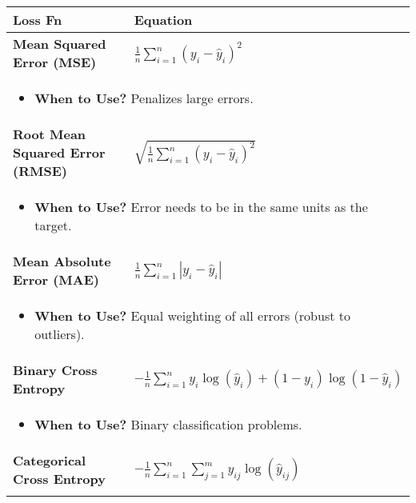 \documentclass{article}
\begin{document}
\begin{summary}
    \begin{center}
        \begin{tabular}{ll}
            \toprule
            \textbf{Loss Fn} & \textbf{Equation} \\ 
            \toprule
            \textbf{Mean Squared Error (MSE)} & $\frac{1}{n} \sum_{i=1}^{n} (y_i - \hat{y}_i)^2$ \\
            \multicolumn{2}{p{\linewidth}}{
            \begin{itemize}
                \item \textbf{When to Use?} Penalizes large errors.
            \end{itemize}} \\
            \midrule
            \textbf{Root Mean Squared Error (RMSE)} & $\sqrt{\frac{1}{n} \sum_{i=1}^{n} (y_i - \hat{y}_i)^2}$ \\
            \multicolumn{2}{p{\linewidth}}{
            \begin{itemize}
                \item \textbf{When to Use?} Error needs to be in the same units as the target.
            \end{itemize}} \\
            \midrule
            \textbf{Mean Absolute Error (MAE)} & $\frac{1}{n} \sum_{i=1}^{n} |y_i - \hat{y}_i|$ \\
            \multicolumn{2}{p{\linewidth}}{
            \begin{itemize}
                \item \textbf{When to Use?} Equal weighting of all errors (robust to outliers).
            \end{itemize}} \\
            \midrule
            \textbf{Binary Cross Entropy} & $- \frac{1}{n} \sum_{i=1}^{n} y_i \log(\hat{y}_i) + (1 - y_i) \log(1 - \hat{y}_i)$ \\
            \multicolumn{2}{p{\linewidth}}{
            \begin{itemize}
                \item \textbf{When to Use?} Binary classification problems.
            \end{itemize}} \\
            \midrule
            \textbf{Categorical Cross Entropy} & $- \frac{1}{n} \sum_{i=1}^{n} \sum_{j=1}^{m} y_{ij} \log(\hat{y}_{ij})$ \\
            \multicolumn{2}{p{\linewidth}}{
            \begin{itemize}

\end{itemize}}
\end{tabular}
\end{center}
\end{summary}
\end{document}
